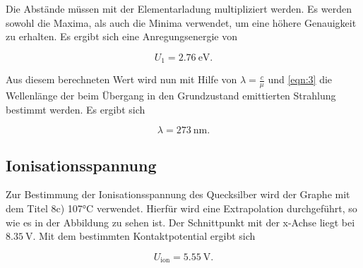 Die Abstände müssen mit der Elementarladung multipliziert werden. Es werden sowohl die Maxima, 
als auch die Minima verwendet, um eine höhere Genauigkeit zu erhalten. Es ergibt sich eine 
Anregungsenergie von 

\begin{equation*}
U_1 = \SI{2.76}{\eV}.
\end{equation*}

Aus diesem berechneten Wert wird nun mit Hilfe von $\lambda = \frac{c}{\mu}$ und \eqref{eqn:3} die Wellenlänge
der beim Übergang in den Grundzustand emittierten Strahlung bestimmt werden. Es ergibt sich

\begin{equation*}
\lambda = \SI{273}{\nano\meter}.
\end{equation*}

\subsection{Ionisationsspannung}

Zur Bestimmung der Ionisationsspannung des Quecksilber wird der Graphe mit dem Titel 8c) 107°C verwendet. 
Hierfür wird eine Extrapolation durchgeführt, so wie es in der Abbildung zu sehen ist. Der Schnittpunkt mit 
der x-Achse liegt bei $\SI{8.35}{\volt}$. Mit dem bestimmten Kontaktpotential ergibt sich

\begin{equation*}
U_\text{ion} = \SI{5.55}{\volt}.
\end{equation*}

